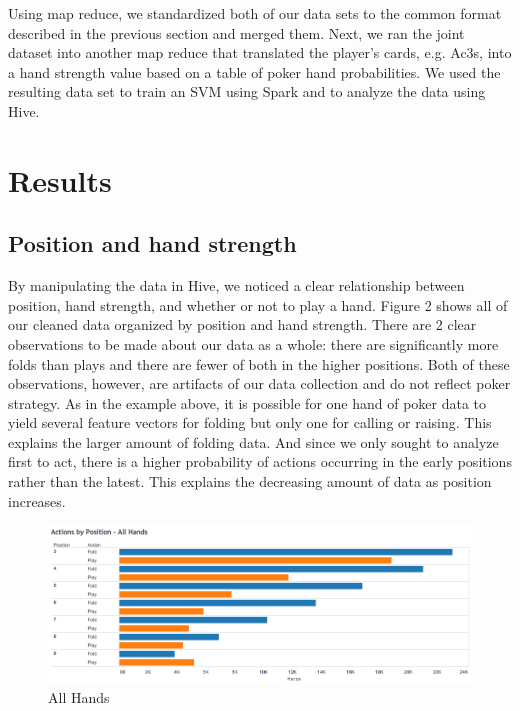 \documentclass[twoside]{article}
\begin{document}
\begin{multicols}{2}
Using map reduce, we standardized both of our data sets to the common format described in the previous section and merged them. Next, we ran the joint dataset into another map reduce that translated the player's cards, e.g. Ac3s, into a hand strength value based on a table of poker hand probabilities. We used the resulting data set to train an SVM using Spark and to analyze the data using Hive. 


\section{Results}

\subsection{Position and hand strength}

By manipulating the data in Hive, we noticed a clear relationship between position, hand strength, and whether or not to play a hand. Figure 2 shows all of our cleaned data organized by position and hand strength. There are 2 clear observations to be made about our data as a whole: there are significantly more folds than plays and there are fewer of both in the higher positions. Both of these observations, however, are artifacts of our data collection and do not reflect poker strategy. As in the example above, it is possible for one hand of poker data to yield several feature vectors for folding but only one for calling or raising. This explains the larger amount of folding data. And since we only sought to analyze first to act, there is a higher probability of actions occurring in the early positions rather than the latest. This explains the decreasing amount of data as position increases.

\begin{figure}[H]
  \centering
  \centerline{\includegraphics[width=1.1\columnwidth]{Allhands.png}}
   \caption{All Hands}
  \label{fig:allHands}
\end{figure}


\end{multicols}
\end{document}
